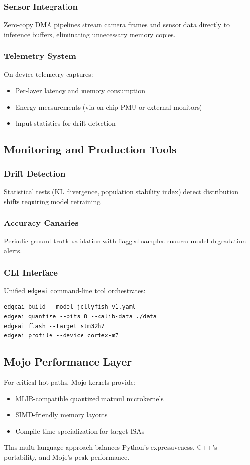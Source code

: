 \subsubsection{Sensor Integration}
Zero-copy DMA pipelines stream camera frames and sensor data directly to inference buffers, eliminating unnecessary memory copies.

\subsubsection{Telemetry System}
On-device telemetry captures:
\begin{itemize}
\item Per-layer latency and memory consumption
\item Energy measurements (via on-chip PMU or external monitors)
\item Input statistics for drift detection
\end{itemize}

\subsection{Monitoring and Production Tools}

\subsubsection{Drift Detection}
Statistical tests (KL divergence, population stability index) detect distribution shifts requiring model retraining.

\subsubsection{Accuracy Canaries}
Periodic ground-truth validation with flagged samples ensures model degradation alerts.

\subsubsection{CLI Interface}
Unified \texttt{edgeai} command-line tool orchestrates:
\begin{verbatim}
edgeai build --model jellyfish_v1.yaml
edgeai quantize --bits 8 --calib-data ./data
edgeai flash --target stm32h7
edgeai profile --device cortex-m7
\end{verbatim}

\subsection{Mojo Performance Layer}

For critical hot paths, Mojo kernels provide:
\begin{itemize}
\item MLIR-compatible quantized matmul microkernels
\item SIMD-friendly memory layouts
\item Compile-time specialization for target ISAs
\end{itemize}

This multi-language approach balances Python's expressiveness, C++'s portability, and Mojo's peak performance.
